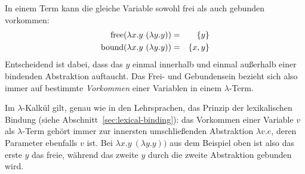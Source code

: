 %
In einem Term kann die gleiche Variable sowohl frei als auch
gebunden vorkommen:
%
\begin{eqnarray*}
  \operatorname{free}(\lambda x.y~(\lambda y.y)) &=& \{ y\} \\
  \operatorname{bound}(\lambda x.y~(\lambda y.y)) &=& \{ x, y\}
\end{eqnarray*}
%
Entscheidend ist dabei, dass das $y$ einmal innerhalb und einmal
außerhalb einer bindenden Abstraktion auftaucht. Das Frei- und
Gebundensein bezieht sich also immer auf bestimmte \emph{Vorkommen}
einer Variablen in einem $\lambda$-Term.

Im $\lambda$-Kalkül gilt, genau wie in den Lehrsprachen, das Prinzip der
lexikalischen Bindung (siehe Abschnitt~\ref{sec:lexical-binding}): das
Vorkommen einer Variable $v$ als $\lambda$-Term gehört immer zur
innersten umschließenden Abstraktion $\lambda v.e$, deren Parameter
ebenfalls $v$ ist.  Bei $\lambda x.y~(\lambda y.y))$ aus dem Beispiel
oben ist also das erste $y$ das freie, während das zweite $y$ durch
die zweite Abstraktion gebunden wird.


